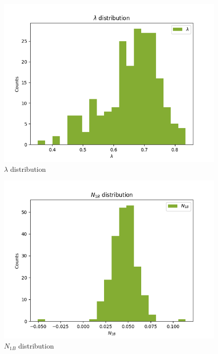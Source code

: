 \documentclass[
]{article}
\begin{document}
\begin{figure}
\centering
\includegraphics{pngplots/param4.png}
\caption{\(\lambda\) distribution}
\end{figure}

\begin{figure}
\centering
\includegraphics{pngplots/param5.png}
\caption{\(N_{1B}\) distribution}
\end{figure}
\end{document}
